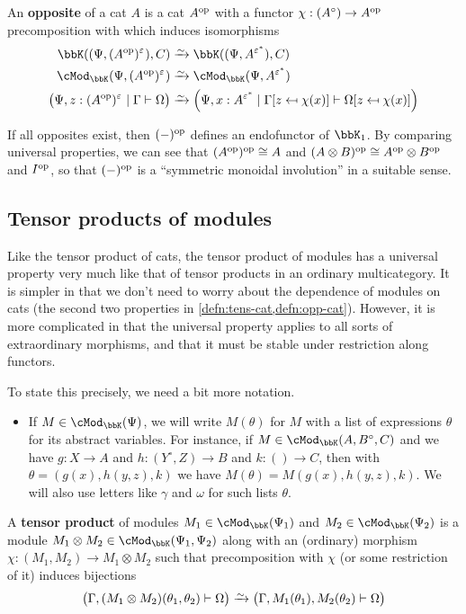 \documentclass{amsart}
\newcommand{\K}{\bbK}
\let\mod\cMod
\def\modk{\mod_\K}
\renewcommand{\o}{^{\circ}}
\newcommand{\e}[1][]{^{\varepsilon_{#1}}}
\newcommand{\epbar}{^{\varepsilon^*}}
\let\mto\vdash    %
\def\mhom#1#2{\left( #1 \vphantom{\big|}\mto #2 \right)}
\def\mhomc#1#2#3{\left( #1 \mid #2 \vphantom{\big|}\mto #3 \right)}
\newcommand{\subst}[3]{{#1}[#2 \mapsfrom #3]}
\begin{document}
\begin{defn}\label{defn:opp-cat}
  An \textbf{opposite} of a cat $A$ is a cat $A^{\mathrm{op}}$ with a functor $\chi:(A\o) \to A\op$ precomposition with which induces isomorphisms
  \begin{align*}
    \K((\Psi,(A\op)\e),C) &\toiso \K((\Psi,A\epbar),C)\\
    \modk(\Psi,(A\op)\e) &\toiso \modk(\Psi,A\epbar) \\
    \mhomc{\Psi,z:(A\op)\e}{\Gamma}{\Omega} &\toiso \mhomc{\Psi,x:A\epbar}{\subst\Gamma z {\chi(x)}}{\subst\Omega z{\chi(x)}}
  \end{align*}
\end{defn}

If all opposites exist, then $(-)^{\mathrm{op}}$ defines an endofunctor of $\K_1$.
By comparing universal properties, we can see that $(A^{\mathrm{op}})^{\mathrm{op}}\cong A$ and $(A\otimes B)^{\mathrm{op}} \cong A^{\mathrm{op}} \otimes B^{\mathrm{op}}$ and $I^{\mathrm{op}}$, so that $(-)^{\mathrm{op}}$ is a ``symmetric monoidal involution'' in a suitable sense.


\subsection{Tensor products of modules}
\label{sec:tens}

Like the tensor product of cats, the tensor product of modules has a universal property very much like that of tensor products in an ordinary multicategory.
It is simpler in that we don't need to worry about the dependence of modules on cats (the second two properties in \cref{defn:tens-cat,defn:opp-cat}).
However, it is more complicated in that the universal property applies to all sorts of extraordinary morphisms, and that it must be stable under restriction along functors.

To state this precisely, we need a bit more notation.
\begin{itemize}
\item If $M\in\modk(\Psi)$, we will write $M(\theta)$ for $M$ with a list of expressions $\theta$ for its abstract variables.
  For instance, if $M\in\modk(A,B\o,C)$ and we have $g:X \to A$ and $h:(Y\o,Z)\to B$ and $k:()\to C$, then with $\theta=(g(x),h(y,z),k)$ we have $M(\theta) = M(g(x),h(y,z),k)$.
  We will also use letters like $\gamma$ and $\omega$ for such lists $\theta$.
\end{itemize}

\begin{defn}
  A \textbf{tensor product} of modules $M_1\in\modk(\Psi_1)$ and $M_2\in\modk(\Psi_2)$ is a module $M_1\otimes M_2 \in \modk(\Psi_1,\Psi_2)$ along with an (ordinary) morphism $\chi:(M_1,M_2)\to M_1\otimes M_2$ such that precomposition with $\chi$ (or some restriction of it) induces bijections
  \[ \mhom{\Gamma,(M_1\otimes M_2)(\theta_1,\theta_2)}{\Omega} \toiso \mhom{\Gamma,M_1(\theta_1),M_2(\theta_2)}{\Omega} \]
\end{defn}
\end{document}
